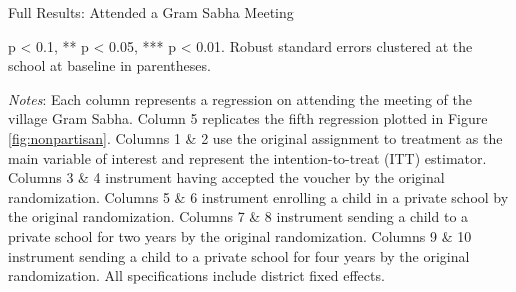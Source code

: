 \documentclass[hidelinks, 12pt, titlepage]{article}
\begin{document}
\begin{landscape}
					\clearpage

					\begin{table}
						\begin{threeparttable}
							\centering
							\caption{Full Results: Attended a Gram Sabha Meeting\label{table:appendixgramsabha}}
							
							\begin{tablenotes}
								\item * p < 0.1, ** p < 0.05, *** p < 0.01. Robust standard errors clustered at the school at baseline in parentheses.
								\item \emph{Notes}: Each column represents a regression on attending the meeting of the village Gram Sabha.  Column 5 replicates the fifth regression plotted in Figure \ref{fig:nonpartisan}.  Columns 1 \& 2 use the original assignment to treatment as the main variable of interest and represent the intention-to-treat (ITT) estimator.  Columns 3 \& 4 instrument having accepted the voucher by the original randomization.  Columns 5 \& 6 instrument enrolling a child in a private school by the original randomization.  Columns 7 \& 8 instrument sending a child to a private school for two years by the original randomization.  Columns 9 \& 10 instrument sending a child to a private school for four years by the original randomization.  All specifications include district fixed effects.
							\end{tablenotes}
						\end{threeparttable}
					\end{table}

				\clearpage

				\end{landscape}
\end{document}
